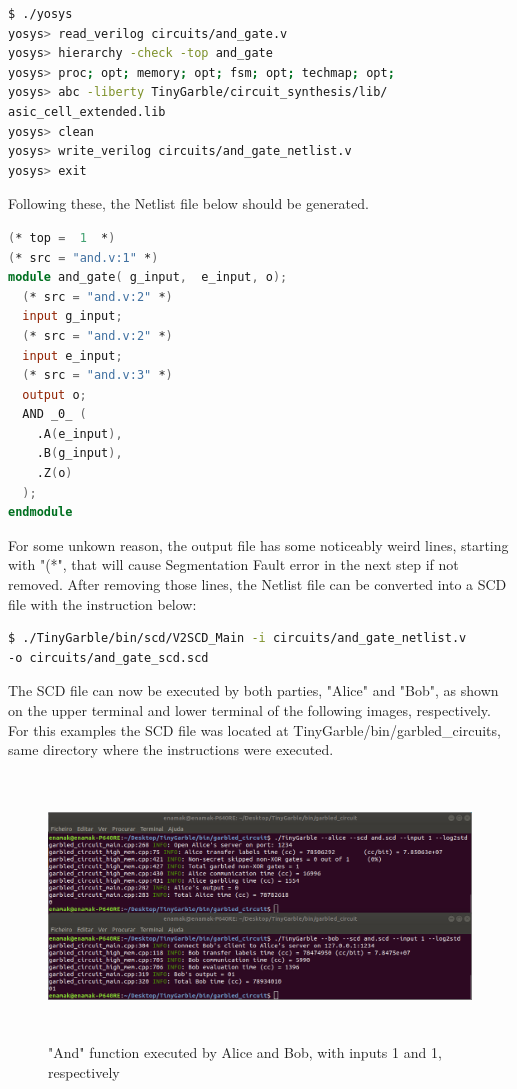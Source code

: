 \begin{refsection}
\begin{lstlisting}[caption={Yosys instructions to compile the HDL file to a Netlist file}, language=bash, captionpos=b]
$ ./yosys
yosys> read_verilog circuits/and_gate.v
yosys> hierarchy -check -top and_gate
yosys> proc; opt; memory; opt; fsm; opt; techmap; opt;
yosys> abc -liberty TinyGarble/circuit_synthesis/lib/
asic_cell_extended.lib
yosys> clean
yosys> write_verilog circuits/and_gate_netlist.v
yosys> exit					
\end{lstlisting}

Following these, the Netlist file below should be generated.

\begin{lstlisting}[caption={and\_gate\_netlist.v}, language=Verilog, captionpos=b]
(* top =  1  *)
(* src = "and.v:1" *)
module and_gate( g_input,  e_input, o);
  (* src = "and.v:2" *)
  input g_input;
  (* src = "and.v:2" *)
  input e_input;
  (* src = "and.v:3" *)
  output o;
  AND _0_ (
    .A(e_input),
    .B(g_input),
    .Z(o)
  );
endmodule
\end{lstlisting}

For some unkown reason, the output file has some noticeably weird lines, starting with "(*", that will cause Segmentation Fault error in the next step if not removed.
After removing those lines, the Netlist file can be converted into a SCD file with the instruction below:

\begin{lstlisting}[caption={Installation of Yosys-abc}, language=bash, captionpos=b]
$ ./TinyGarble/bin/scd/V2SCD_Main -i circuits/and_gate_netlist.v
-o circuits/and_gate_scd.scd		
\end{lstlisting}

\newpage

The SCD file can now be executed by both parties, "Alice" and "Bob", as shown on the upper terminal and lower terminal of the following images, respectively.
For this examples the SCD file was located at TinyGarble/bin/garbled\_circuits, same directory where the instructions were executed.

\begin{figure}[H]
	\centering
	\includegraphics[width=1\textwidth, height=7cm]{./sdf/secure_multiparty_computation/figures/tinygarble_and_a.png}
    \caption{"And" function executed by Alice and Bob, with inputs 1 and 1, respectively}\label{fig:tinygarble_and_a}
\end{figure}


\end{refsection}

